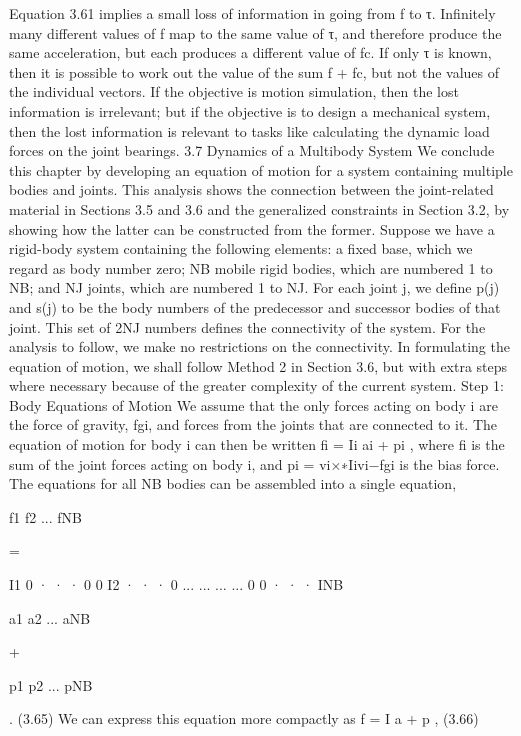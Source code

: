 Equation 3.61 implies a small loss of information in going from f to τ. Infinitely many different values of f map to the same value of τ, and therefore produce the same acceleration, but each produces a different value of fc. If only τ is known, then it is possible to work out the value of the sum f + fc, but not the values of the individual vectors. If the objective is motion simulation, then the lost information is irrelevant; but if the objective is to design a mechanical system, then the lost information is relevant to tasks like calculating the dynamic load forces on the joint bearings. 3.7 Dynamics of a Multibody System We conclude this chapter by developing an equation of motion for a system containing multiple bodies and joints. This analysis shows the connection between the joint-related material in Sections 3.5 and 3.6 and the generalized constraints in Section 3.2, by showing how the latter can be constructed from the former. Suppose we have a rigid-body system containing the following elements: a fixed base, which we regard as body number zero; NB mobile rigid bodies, which are numbered 1 to NB; and NJ joints, which are numbered 1 to NJ. For each joint j, we define p(j) and s(j) to be the body numbers of the predecessor and successor bodies of that joint. This set of 2NJ numbers defines the connectivity of the system. For the analysis to follow, we make no restrictions on the connectivity. In formulating the equation of motion, we shall follow Method 2 in Section 3.6, but with extra steps where necessary because of the greater complexity of the current system. Step 1: Body Equations of Motion We assume that the only forces acting on body i are the force of gravity, fgi, and forces from the joints that are connected to it. The equation of motion for body i can then be written fi = Ii ai + pi , where fi is the sum of the joint forces acting on body i, and pi = vi×∗Iivi−fgi is the bias force. The equations for all NB bodies can be assembled into a single equation,

f1 f2 ... fNB

=

I1 0 · · · 0 0 I2 · · · 0 ... ... ... ... 0 0 · · · INB

a1 a2 ... aNB

+

p1 p2 ... pNB

. (3.65) We can express this equation more compactly as f = I a + p , (3.66)


